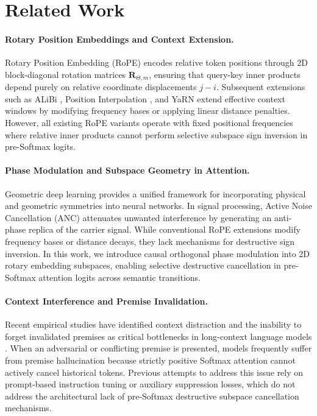 \documentclass[11pt,a4paper]{article}
\theoremstyle{definition}
\begin{document}
\section{Related Work}
\paragraph{Rotary Position Embeddings and Context Extension.}
Rotary Position Embedding (RoPE) \cite{su2024roformer} encodes relative token positions through 2D block-diagonal rotation matrices $\mathbf{R}_{\Theta, m}$, ensuring that query-key inner products depend purely on relative coordinate displacements $j - i$. Subsequent extensions such as ALiBi \cite{press2021train}, Position Interpolation \cite{chen2023extending}, and YaRN \cite{peng2023yarn} extend effective context windows by modifying frequency bases or applying linear distance penalties. However, all existing RoPE variants operate with fixed positional frequencies where relative inner products cannot perform selective subspace sign inversion in pre-Softmax logits.

\paragraph{Phase Modulation and Subspace Geometry in Attention.}
Geometric deep learning \cite{bronstein2021geometric} provides a unified framework for incorporating physical and geometric symmetries into neural networks. In signal processing, Active Noise Cancellation (ANC) attenuates unwanted interference by generating an anti-phase replica of the carrier signal. While conventional RoPE extensions \cite{press2021train, chen2023extending, peng2023yarn} modify frequency bases or distance decays, they lack mechanisms for destructive sign inversion. In this work, we introduce causal orthogonal phase modulation into 2D rotary embedding subspaces, enabling selective destructive cancellation in pre-Softmax attention logits across semantic transitions.

\paragraph{Context Interference and Premise Invalidation.}
Recent empirical studies have identified context distraction and the inability to forget invalidated premises as critical bottlenecks in long-context language models \cite{liu2024lost, hsieh2024ruler, kamradt2023needle}. When an adversarial or conflicting premise is presented, models frequently suffer from premise hallucination because strictly positive Softmax attention cannot actively cancel historical tokens. Previous attempts to address this issue rely on prompt-based instruction tuning or auxiliary suppression losses, which do not address the architectural lack of pre-Softmax destructive subspace cancellation mechanisms.
\end{document}
